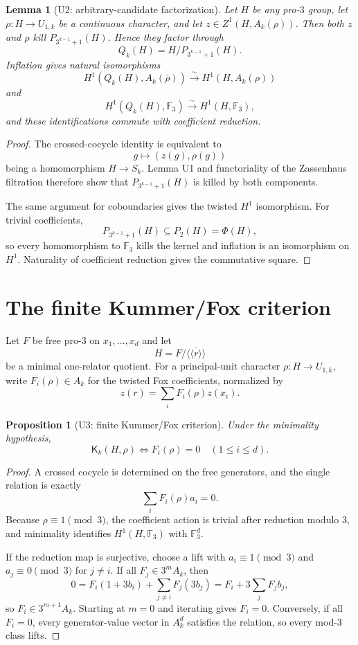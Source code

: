 \documentclass[11pt]{article}
\newtheorem{proposition}[theorem]{Proposition}
\newtheorem{lemma}[theorem]{Lemma}
\begin{document}
\begin{lemma}[U2: arbitrary-candidate factorization]
Let $H$ be any pro-$3$ group, let
$\rho:H\to U_{1,k}$ be a continuous character, and let
$z\in Z^1(H,A_k(\rho))$. Then both $z$ and $\rho$ kill
$P_{3^{k-1}+1}(H)$. Hence they factor through
\[
Q_k(H)=H/P_{3^{k-1}+1}(H).
\]
Inflation gives natural isomorphisms
\[
H^1(Q_k(H),A_k(\bar\rho))
\xrightarrow{\sim}
H^1(H,A_k(\rho))
\]
and
\[
H^1(Q_k(H),\mathbb F_3)
\xrightarrow{\sim}
H^1(H,\mathbb F_3),
\]
and these identifications commute with coefficient reduction.
\end{lemma}

\begin{proof}
The crossed-cocycle identity is equivalent to
\[
g\longmapsto(z(g),\rho(g))
\]
being a homomorphism $H\to S_k$. Lemma U1 and functoriality of the
Zassenhaus filtration therefore show that
$P_{3^{k-1}+1}(H)$ is killed by both components.

The same argument for coboundaries gives the twisted $H^1$ isomorphism.
For trivial coefficients,
\[
P_{3^{k-1}+1}(H)\subseteq P_2(H)=\Phi(H),
\]
so every homomorphism to $\mathbb F_3$ kills the kernel and inflation is
an isomorphism on $H^1$. Naturality of coefficient reduction gives the
commutative square.
\end{proof}

\section{The finite Kummer/Fox criterion}

Let $F$ be free pro-$3$ on $x_1,\ldots,x_d$ and let
\[
H=F/\overline{\langle\!\langle r\rangle\!\rangle}
\]
be a minimal one-relator quotient. For a principal-unit character
$\rho:H\to U_{1,k}$, write $F_i(\rho)\in A_k$ for the twisted Fox
coefficients, normalized by
\[
z(r)=\sum_iF_i(\rho)z(x_i).
\]

\begin{proposition}[U3: finite Kummer/Fox criterion]
Under the minimality hypothesis,
\[
\boxed{
\mathsf K_k(H,\rho)\Longleftrightarrow
F_i(\rho)=0\quad(1\le i\le d).
}
\]
\end{proposition}

\begin{proof}
A crossed cocycle is determined on the free generators, and the single
relation is exactly
\[
\sum_iF_i(\rho)a_i=0.
\]
Because $\rho\equiv1\pmod3$, the coefficient action is trivial after
reduction modulo $3$, and minimality identifies
$H^1(H,\mathbb F_3)$ with $\mathbb F_3^d$.

If the reduction map is surjective, choose a lift with
$a_i\equiv1\pmod3$ and $a_j\equiv0\pmod3$ for $j\ne i$.
If all $F_j\in3^mA_k$, then
\[
0=F_i(1+3b_i)+\sum_{j\ne i}F_j(3b_j)
=F_i+3\sum_jF_jb_j,
\]
so $F_i\in3^{m+1}A_k$. Starting at $m=0$ and iterating gives
$F_i=0$. Conversely, if all $F_i=0$, every generator-value vector
in $A_k^d$ satisfies the relation, so every mod-$3$ class lifts.
\end{proof}
\end{document}
